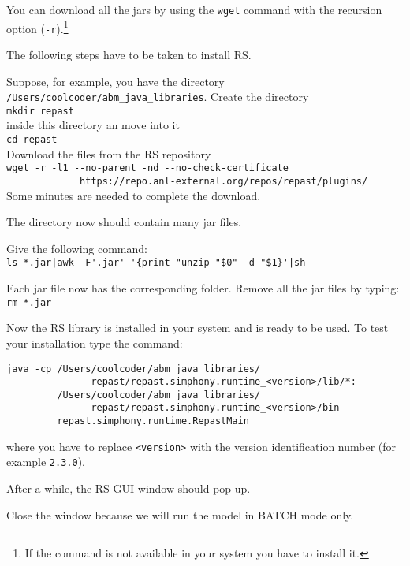 \documentclass{article}
\begin{document}
You can download all the jars by using the \verb+wget+ command with the recursion option (\verb+-r+).\footnote{If the command is not available in your system you have to install it.}

The following steps have to be taken to install RS.

Suppose, for example, you have the directory \verb+/Users/coolcoder/abm_java_libraries+. Create the directory\\
\verb+mkdir repast+\\
inside this directory an move into it\\
\verb+cd repast+\\

Download the files from the RS repository\\
\verb+wget -r -l1 --no-parent -nd --no-check-certificate +\\
\verb+             https://repo.anl-external.org/repos/repast/plugins/+\\

Some minutes are needed to complete the download.%

The directory now should contain many jar files.

Give the following command:\\
\verb+ls *.jar|awk -F'.jar' '{print "unzip "$0" -d "$1}'|sh+

Each jar file now has the corresponding folder.
Remove all the jar files by typing:\\
\verb+rm *.jar+

Now the RS library is installed in your system and is ready to be used.
To test your installation type the command:\\
\begin{verbatim}
java -cp /Users/coolcoder/abm_java_libraries/
               repast/repast.simphony.runtime_<version>/lib/*:
         /Users/coolcoder/abm_java_libraries/
               repast/repast.simphony.runtime_<version>/bin 
         repast.simphony.runtime.RepastMain
\end{verbatim}
where you have to replace \verb+<version>+ with the version identification number (for example \verb+2.3.0+).

After a while, the RS GUI window should pop up.

Close the window because we will run the model in BATCH mode only.
\end{document}
